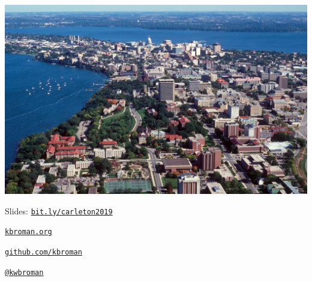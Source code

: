 \documentclass[12pt,t,aspectratio=169]{beamer}
\begin{document}
\begin{frame}[c]{}

  \vspace{-10mm} \hspace*{-13mm}
  \includegraphics[height=1.2\textheight]{Pics/madison.jpg}

\end{frame}



\begin{frame}[c]{}

\Large

Slides: \href{https://bit.ly/carleton2019}{\tt bit.ly/carleton2019}

\vspace{7mm}

\href{https://kbroman.org}{\tt \lolit kbroman.org}

\vspace{7mm}

\href{https://github.com/kbroman}{\tt \lolit github.com/kbroman}

\vspace{7mm}

\href{https://twitter.com/kwbroman}{\tt \lolit @kwbroman}


\end{frame}
\end{document}

